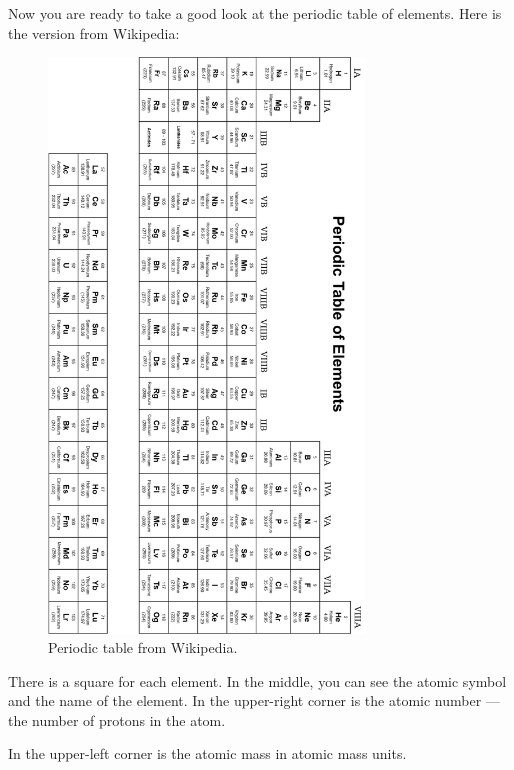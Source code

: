 Now you are ready to take a good look at the periodic table of
elements. Here is the version from Wikipedia:
\begin{figure}[htbp]
    \centering
    \includegraphics[width=0.75\textwidth]{periodic.png}
    \caption{Periodic table from Wikipedia.}
    \label{fig:periodic_tbl}
\end{figure}


\pagebreak
There is a square for each element. In the middle, you can see the atomic
symbol and the name of the element. In the upper-right corner is the
atomic number --- the number of protons in the atom.

In the upper-left corner is the atomic mass in atomic mass units.

